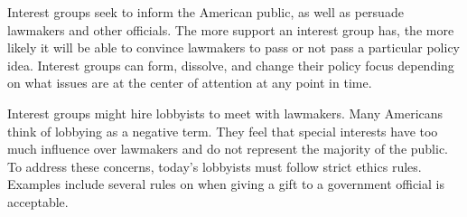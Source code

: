 Interest groups seek to inform the American public, as well as persuade
lawmakers and other officials. The more support an interest group has, the more
likely it will be able to convince lawmakers to pass or not pass a particular
policy idea. Interest groups can form, dissolve, and change their policy focus
depending on what issues are at the center of attention at any point in time.

Interest groups might hire lobbyists to meet with lawmakers. Many Americans
think of lobbying as a negative term. They feel that special interests have too
much influence over lawmakers and do not represent the majority of the public.
To address these concerns, today's lobbyists must follow strict ethics rules.
Examples include several rules on when giving a gift to a government official is
acceptable.

\newpage
